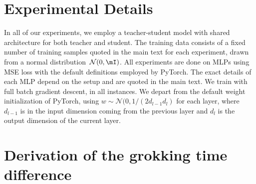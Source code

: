 \documentclass[a4paper,11pt]{article}
\begin{document}
\section{Experimental Details}
\label{sec:app_experimental_details}

In all of our experiments, we employ a teacher-student model with shared architecture for both teacher and student. The training data consists of a fixed number of training samples quoted in the main text for each experiment, drawn from a normal distribution~$\mathcal{N}(0,\mI)$. All experiments are done on MLPs using MSE loss with the default definitions employed by PyTorch. The exact details of each MLP depend on the setup and are quoted in the main text. We train with full batch gradient descent, in all instances. We depart from the default weight initialization of PyTorch, using $w \sim \mathcal{N}(0, 1/(2 d_{l-1} d_l)$ for each layer, where $d_{l-1}$ is in the input dimension coming from the previous layer and $d_l$ is the output dimension of the current layer.


\section{Derivation of the grokking time difference}
\label{sec:app_grokking_time_difference}
\end{document}
